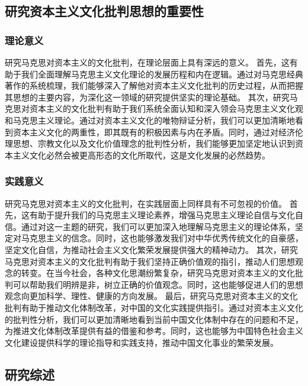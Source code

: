 \documentclass[a4paper]{ctexart}
\begin{document}
\subsection{研究资本主义文化批判思想的重要性}
\subsubsection{理论意义}
研究马克思对资本主义的文化批判，在理论层面上具有深远的意义。
首先，这有助于我们全面理解马克思主义文化理论的发展历程和内在逻辑。通过对马克思经典著作的系统梳理，我们能够深入了解他对资本主义文化批判的历史过程，从而把握其思想的主要内容，为深化这一领域的研究提供坚实的理论基础。
其次，研究马克思对资本主义的文化批判有助于我们系统全面认知和深入领会马克思主义文化观和马克思主义理论。通过对资本主义文化的唯物辩证分析，我们可以更加清晰地看到资本主义文化的两重性，即其既有的积极因素与内在矛盾。同时，通过对经济伦理思想、宗教文化以及文化价值理念的批判性分析，我们能够更加坚定地认识到资本主义文化必然会被更高形态的文化所取代，这是文化发展的必然趋势。
\subsubsection{实践意义}
研究马克思对资本主义的文化批判，在实践层面上同样具有不可忽视的价值。
首先，这有助于提升我们的马克思主义理论素养，增强马克思主义理论自信与文化自信。通过对这一主题的研究，我们可以更加深入地理解马克思主义的理论体系，坚定对马克思主义的信念。同时，这也能够激发我们对中华优秀传统文化的自豪感，坚定文化自信，为推动社会主义文化繁荣发展提供强大的精神动力。
其次，研究马克思对资本主义的文化批判有助于我们坚持正确价值观的指引，推动人们思想观念的转变。在当今社会，各种文化思潮纷繁复杂，研究马克思对资本主义的文化批判可以帮助我们明辨是非，树立正确的价值观念。同时，这也能够促进人们的思想观念向更加科学、理性、健康的方向发展。
最后，研究马克思对资本主义的文化批判有助于推动文化体制改革，对中国的文化实践提供指引。通过对资本主义文化的批判性分析，我们可以更加清晰地看到当前中国文化体制中存在的问题和不足，为推进文化体制改革提供有益的借鉴和参考。同时，这也能够为中国特色社会主义文化建设提供科学的理论指导和实践支持，推动中国文化事业的繁荣发展。
\subsection{研究综述}
\end{document}
